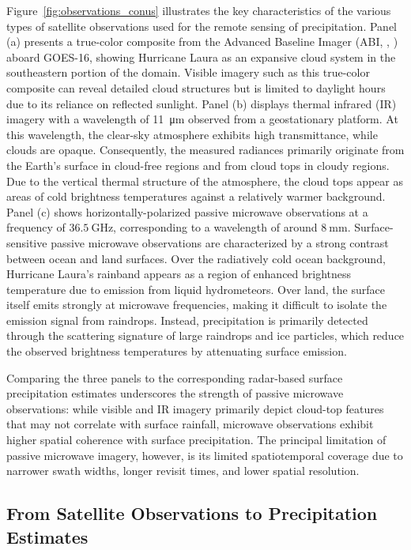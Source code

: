 \documentclass[11pt]{article}
\begin{document}
Figure~\ref{fig:observations_conus} illustrates the key characteristics of the
various types of satellite observations used for the remote sensing of
precipitation. Panel (a) presents a true-color composite from the Advanced
Baseline Imager (ABI, \citeauthor{Schmit2005Introducing},
\citeyear{Schmit2005Introducing}) aboard GOES-16, showing Hurricane Laura as an
expansive cloud system in the southeastern portion of the domain. Visible
imagery such as this true-color composite can reveal detailed cloud structures
but is limited to daylight hours due to its reliance on reflected sunlight.
Panel (b) displays thermal infrared (IR) imagery with a wavelength of
\SI{11}{\micro \meter} observed from a geostationary platform. At this
wavelength, the clear-sky atmosphere exhibits high transmittance, while clouds
are opaque. Consequently, the measured radiances primarily originate from the
Earth’s surface in cloud-free regions and from cloud tops in cloudy regions. Due
to the vertical thermal structure of the atmosphere, the cloud tops appear as
areas of cold brightness temperatures against a relatively warmer background.
Panel (c) shows horizontally-polarized passive microwave observations at a
frequency of $\SI{36.5}{\giga \hertz}$, corresponding to a wavelength of around
$\SI{8}{\milli \meter}$. Surface-sensitive passive microwave observations are
characterized by a strong contrast between ocean and land surfaces. Over the
radiatively cold ocean background, Hurricane Laura's rainband appears as a
region of enhanced brightness temperature due to emission from liquid
hydrometeors. Over land, the surface itself emits strongly at microwave
frequencies, making it difficult to isolate the emission signal from raindrops.
Instead, precipitation is primarily detected through the scattering signature of
large raindrops and ice particles, which reduce the observed brightness
temperatures by attenuating surface emission.

Comparing the three panels to the corresponding radar-based surface
precipitation estimates underscores the strength of passive microwave
observations: while visible and IR imagery primarily depict cloud-top features
that may not correlate with surface rainfall, microwave observations exhibit
higher spatial coherence with surface precipitation. The principal limitation of
passive microwave imagery, however, is its limited spatiotemporal coverage due
to narrower swath widths, longer revisit times, and lower spatial resolution.

\subsection{From Satellite Observations to Precipitation Estimates}
\end{document}
